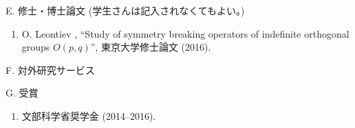 \documentclass[a4j,twocolumn]{jarticle}
\begin{document}
\noindent
E. 修士・博士論文 (学生さんは記入されなくてもよい。)

\vspace{0.1cm}
\begin{enumerate}
	\item O. Leontiev , ``Study of symmetry breaking operators of indefinite orthogonal groups $O(p,q)$'', 東京大学修士論文
		(2016).
\end{enumerate}



\vspace{0.2cm}
\noindent
F. 対外研究サービス

\vspace{0.1cm}



\vspace{0.2cm}
\noindent
G. 受賞

\vspace{0.1cm}
\begin{enumerate}
	\item 文部科学省奨学金 (2014--2016).
\end{enumerate}
\end{document}
